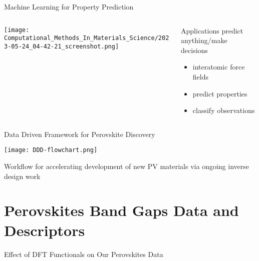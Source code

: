 \documentclass[10pt, aspectratio=169, presentation]{beamer}
\begin{document}
\begin{frame}[label={sec:org91eade9}]{Machine Learning for Property Prediction}
\begin{columns}
\begin{column}{0.7\columnwidth}
\begin{center}
\texttt{[image: Computational\_Methods\_In\_Materials\_Science/2023-05-24\_04-42-21\_screenshot.png]}
\end{center}
\end{column}

\begin{column}{0.3\columnwidth}
\begin{block}{Applications}
predict anything/make decisions\autocite{pablo-2019-new-front}
\begin{itemize}
\item interatomic force fields
\item predict properties
\item classify observations
\end{itemize}
\end{block}
\end{column}
\end{columns}
\end{frame}

\begin{frame}[label={sec:org7c180a5}]{Data Driven Framework for Perovskite Discovery}
\begin{center}
\texttt{[image: DDD-flowchart.png]}
\end{center}
\center{}\vspace{-0.75cm}Workflow for accelerating development of new PV materials
\autocite{yang-2023-high-throug}
via ongoing inverse design work
\autocite{yang-2023-discov-novel}
\end{frame}

\section{Perovskites Band Gaps Data and Descriptors}
\label{sec:org8595ee1}
\begin{frame}[label={sec:orgbf08fa9}]{Effect of DFT Functionals on Our Perovskites Data}
 
\begin{center}

\end{center}
\end{frame}
\end{document}
